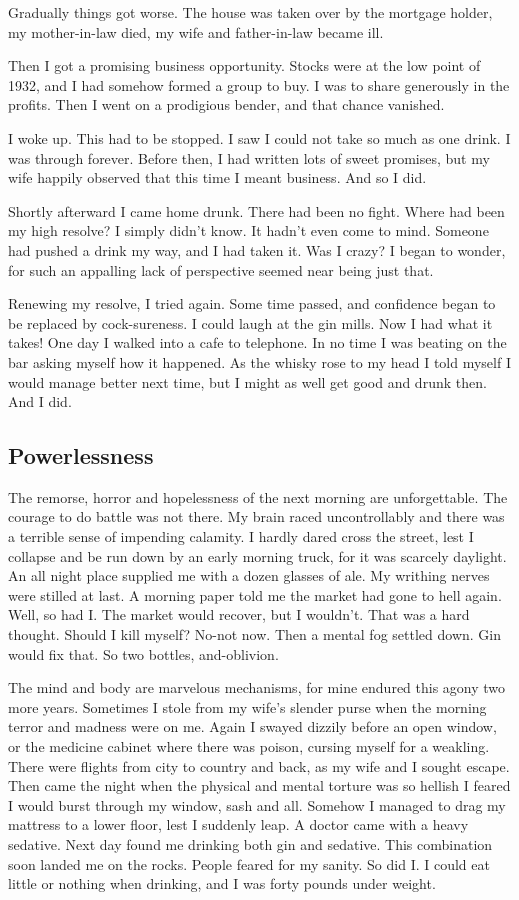 Gradually things got worse.
The house was taken over by the mortgage holder, my mother-in-law died, my wife and father-in-law became ill.

Then I got a promising business opportunity.
Stocks were at the low point of 1932, and I had somehow formed a group to buy.
I was to share generously in the profits.
Then I went on a prodigious bender, and that chance vanished.

I woke up.
This had to be stopped. 
I saw I could not take so much as one drink.
I was through forever.
Before then, I had written lots of sweet promises, but my wife happily observed that this time I meant business.
And so I did.

Shortly afterward I came home drunk.
There had been no fight.
Where had been my high resolve?
I simply didn't know.
It hadn't even come to mind.
Someone had pushed a drink my way, and I had taken it.
Was I crazy?
I began to wonder, for such an appalling lack of perspective seemed near being just that.

Renewing my resolve, I tried again.
Some time passed, and confidence began to be replaced by cock-sureness.
I could laugh at the gin mills.
Now I had what it takes!
One day I walked into a cafe to telephone.
In no time I was beating on the bar asking myself how it happened.
As the whisky rose to my head I told myself I would manage better next time, but I might as well get good and drunk then.
And I did.


\subsection{Powerlessness}

The remorse, horror and hopelessness of the next morning are unforgettable.
The courage to do battle was not there.
My brain raced uncontrollably and there was a terrible sense of impending calamity.
I hardly dared cross the street, lest I collapse and be run down by an early morning truck, for it was scarcely daylight.
An all night place supplied me with a dozen glasses of ale.
My writhing nerves were stilled at last.
A morning paper told me the market had gone to hell again.
Well, so had I.
The market would recover, but I wouldn't.
That was a hard thought.
Should I kill myself?
No-not now.
Then a mental fog settled down.
Gin would fix that.
So two bottles, and-oblivion.

The mind and body are marvelous mechanisms, for mine endured this agony two more years.
Sometimes I stole from my wife's slender purse when the morning terror and madness were on me.
Again I swayed dizzily before an open window, or the medicine cabinet where there was poison, cursing myself for a weakling.
There were flights from city to country and back, as my wife and I sought escape.
Then came the night when the physical and mental torture was so hellish I feared I would burst through my window, sash and all.
Somehow I managed to drag my mattress to a lower floor, lest I suddenly leap.
A doctor came with a heavy sedative.
Next day found me drinking both gin and sedative.
This combination soon landed me on the rocks.
People feared for my sanity.
So did I.
I could eat little or nothing when drinking, and I was forty pounds under weight.


